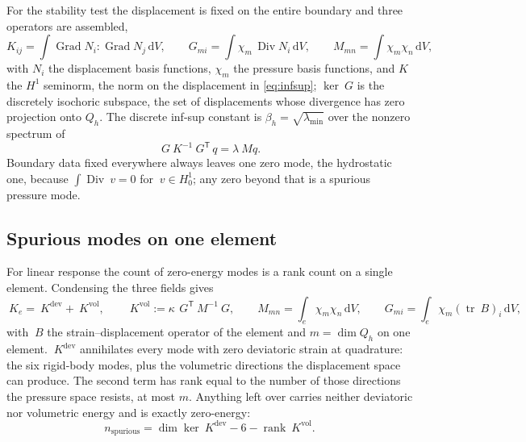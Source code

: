 \documentclass[11pt]{article}
\newcommand{\Grad}{\operatorname{Grad}}
\newcommand{\Div}{\operatorname{Div}}
\newcommand{\trace}{\operatorname{tr}}
\newcommand{\transpose}[1]{#1^{\mathsf{T}}}
\newcommand{\diff}{\,\mathrm{d}}
\newcommand{\supvol}{^{\mathrm{vol}}}
\newcommand{\supdev}{^{\mathrm{dev}}}
\theoremstyle{definition}
\theoremstyle{plain}
\begin{document}
For the stability test the displacement is fixed on the entire boundary and
three operators are assembled,
\begin{equation}
  \label{eq:infsup-ops}
  K_{ij} = \int \Grad N_i : \Grad N_j \diff V,
  \qquad
  G_{mi} = \int \chi_m \, \Div N_i \diff V,
  \qquad
  M_{mn} = \int \chi_m \chi_n \diff V,
\end{equation}
with $N_i$ the displacement basis functions, $\chi_m$ the pressure basis
functions, and $K$ the $H^1$ seminorm, the norm on the displacement in
\eqref{eq:infsup}; $\ker ~G$ is the discretely isochoric subspace, the set of
displacements whose divergence has zero projection onto $Q_h$. The discrete inf-sup
constant is $\beta_h = \sqrt{\lambda_{\min}}$ over the nonzero spectrum of
\begin{equation}
  \label{eq:infsup-eig}
  ~G ~K^{-1} \transpose{~G}\, q = \lambda ~M q .
\end{equation}
Boundary data fixed everywhere always leaves one zero mode, the hydrostatic
one, because $\int \Div ~v = 0$ for $~v \in H^1_0$; any zero beyond
that is a spurious pressure mode.

\subsection{Spurious modes on one element}
\label{sec:firstresult}

For linear response the count of zero-energy modes is a rank count on a single
element. Condensing the three fields gives
\begin{equation}
  \label{eq:condensed}
  ~K_e = ~K\supdev + ~K\supvol,
  \qquad
  ~K\supvol := \kappa\, \transpose{~G} ~M^{-1} ~G,
  \qquad
  M_{mn} = \int_e \chi_m \chi_n \diff V,
  \qquad
  G_{mi} = \int_e \chi_m \left(\trace ~B\right)_i \diff V ,
\end{equation}
with $~B$ the strain--displacement operator of the element and $m = \dim Q_h$
on one element.
$~K\supdev$ annihilates every mode with zero deviatoric strain at quadrature:
the six rigid-body modes, plus the volumetric directions the displacement space
can produce. The second term has rank equal to the number of those directions
the pressure space resists, at most $m$. Anything left over carries neither
deviatoric nor volumetric energy and is exactly zero-energy:
\begin{equation}
  \label{eq:spurious}
  n_{\mathrm{spurious}} = \dim \ker ~K\supdev - 6 - \operatorname{rank} ~K\supvol .
\end{equation}
\end{document}
